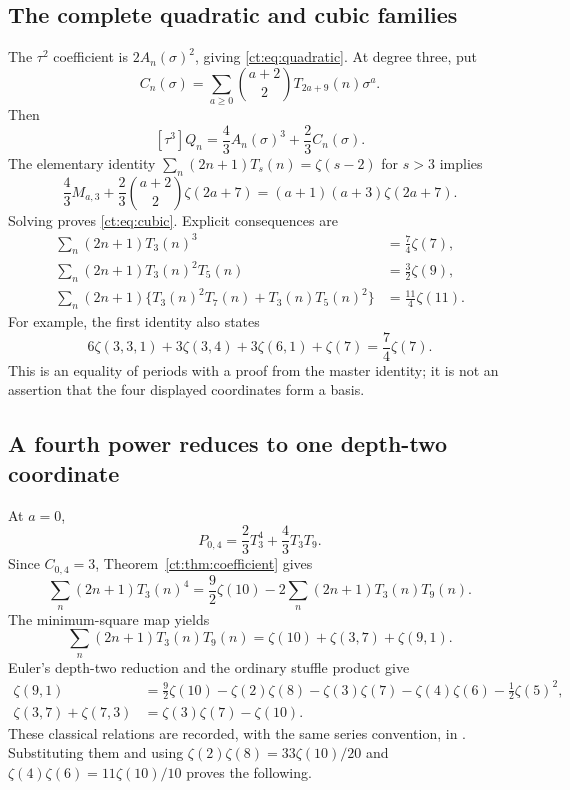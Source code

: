 \documentclass[11pt]{article}
\numberwithin{equation}{section}
\theoremstyle{definition}\newtheorem{definition}[theorem]{Definition}
\theoremstyle{remark}\newtheorem{remark}[theorem]{Remark}
\begin{document}
\subsection{The complete quadratic and cubic families}
The $\tau^2$ coefficient is $2A_n(\sigma)^2$, giving
\eqref{ct:eq:quadratic}. At degree three, put
\[
 C_n(\sigma)=\sum_{a\ge0}\binom{a+2}{2}T_{2a+9}(n)\sigma^a.
\]
Then
\begin{equation}\label{ct:eq:tau3}
 [\tau^3]Q_n=\frac43A_n(\sigma)^3+\frac23C_n(\sigma).
\end{equation}
The elementary identity $\sum_n(2n+1)T_s(n)=\zeta(s-2)$ for $s>3$ implies
\[
 \frac43M_{a,3}+\frac23\binom{a+2}{2}\zeta(2a+7)
       =(a+1)(a+3)\zeta(2a+7).
\]
Solving proves \eqref{ct:eq:cubic}. Explicit consequences are
\begin{align}
 \sum_n(2n+1)T_3(n)^3&=\frac74\zeta(7),\label{ct:eq:cube0}\\
 \sum_n(2n+1)T_3(n)^2T_5(n)&=\frac32\zeta(9),\label{ct:eq:cube1}\\
 \sum_n(2n+1)\{T_3(n)^2T_7(n)+T_3(n)T_5(n)^2\}
       &=\frac{11}{4}\zeta(11).\label{ct:eq:cube2}
\end{align}
For example, the first identity also states
\begin{equation}\label{ct:eq:cubic-mzv}
 6\zeta(3,3,1)+3\zeta(3,4)+3\zeta(6,1)+\zeta(7)
      =\frac74\zeta(7).
\end{equation}
This is an equality of periods with a proof from the master identity;
it is not an assertion that the four displayed coordinates form a basis.

\subsection{A fourth power reduces to one depth-two coordinate}
At $a=0$,
\begin{equation}\label{ct:eq:tau4}
 P_{0,4}=\frac23T_3^4+\frac43T_3T_9.
\end{equation}
Since $C_{0,4}=3$, Theorem~\ref{ct:thm:coefficient} gives
\begin{equation}\label{ct:eq:quartic-start}
 \sum_n(2n+1)T_3(n)^4
       =\frac92\zeta(10)-2\sum_n(2n+1)T_3(n)T_9(n).
\end{equation}
The minimum-square map yields
\[
 \sum_n(2n+1)T_3(n)T_9(n)
       =\zeta(10)+\zeta(3,7)+\zeta(9,1).
\]
Euler's depth-two reduction and the ordinary stuffle product give
\begin{align*}
 \zeta(9,1)&=\frac92\zeta(10)-\zeta(2)\zeta(8)-\zeta(3)\zeta(7)
                         -\zeta(4)\zeta(6)-\tfrac12\zeta(5)^2,\\
 \zeta(3,7)+\zeta(7,3)&=\zeta(3)\zeta(7)-\zeta(10).
\end{align*}
These classical relations are recorded, with the same series convention,
in \cite[\S2]{ct:hoffman}. Substituting them and using
$\zeta(2)\zeta(8)=33\zeta(10)/20$ and
$\zeta(4)\zeta(6)=11\zeta(10)/10$ proves the following.
\end{document}

